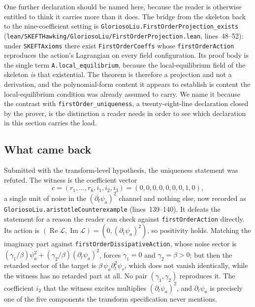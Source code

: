 \documentclass[11pt]{article}
\begin{document}
One further declaration should be named here, because the reader is
otherwise entitled to think it carries more than it does. The bridge
from the skeleton back to the nine-coefficient setting is
\texttt{GloriosoLiu.FirstOrderProjection\_exists}
(\texttt{lean/SKEFTHawking/GloriosoLiu/FirstOrderProjection.lean},
lines~48--52): under \texttt{SKEFTAxioms} there exist
\texttt{FirstOrderCoeffs} whose \texttt{firstOrderAction} reproduces the
action's Lagrangian on every field configuration. Its proof body is
the single term \texttt{A.local\_equilibrium}, because the
local-equilibrium field of the skeleton \emph{is} that existential. The
theorem is therefore a projection and not a derivation, and the
polynomial-form content it appears to establish is content the
local-equilibrium condition was already assumed to carry. We name it
because the contrast with \texttt{firstOrder\_uniqueness}, a
twenty-eight-line declaration closed by the prover, is the distinction a
reader needs in order to see which declaration in this section carries
the load.

\subsection{What came back}

Submitted with the transform-level hypothesis, the uniqueness statement
was refuted. The witness is the coefficient vector
%
\[
c = (r_1,\ldots,r_6,i_1,i_2,i_3) = (0,0,0,0,0,0,0,1,0),
\]
%
a single unit of noise in the $(\partial_t\psi_a)^2$ channel and nothing
else, now recorded as
\texttt{GloriosoLiu.aristotleCounterexample} (lines~139--140). It
defeats the statement for a reason the reader can check against
\texttt{firstOrderAction} directly. Its action is
$(\operatorname{Re}\mathcal{L},\operatorname{Im}\mathcal{L}) =
(0,(\partial_t\psi_a)^2)$, so positivity holds. Matching the imaginary
part against \texttt{firstOrderDissipativeAction}, whose noise sector is
$(\gamma_1/\beta)\psi_a^2 + (\gamma_2/\beta)(\partial_t\psi_a)^2$, forces
$\gamma_1 = 0$ and $\gamma_2 = \beta > 0$; but then the retarded sector
of the target is $\beta\,\psi_a\partial_t^2\psi_r$, which does not
vanish identically, while the witness has no retarded part at all. No
pair $(\gamma_1,\gamma_2)$ reproduces it. The coefficient $i_2$ that the
witness excites multiplies $(\partial_t\psi_a)^2$, and
$\partial_t\psi_a$ is precisely one of the five components the transform
specification never mentions.
\end{document}
